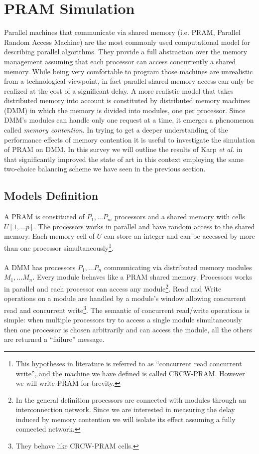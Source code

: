 \section{PRAM Simulation}

Parallel machines that communicate via shared memory
(i.e. PRAM, Parallel Random Access Machine) are the most
commonly used computational model for describing parallel algorithms.
They provide a full abstraction over the memory management assuming
that each processor can access concurrently a shared memory. While being
very comfortable to program those machines are unrealistic from a technological
viewpoint, in fact parallel shared memory access can only be realized at the
cost of a significant delay. A more realistic model that takes distributed
memory into account is constituted by distributed memory machines (DMM) in which
the memory is divided into modules, one per processor. Since DMM's modules can
handle only one request at a time, it emerges a phenomenon
called \textit{memory contention}.
In trying to get a deeper understanding of the performance
effects of memory contention it is useful to investigate the simulation of
 PRAM on DMM. In this survey we will outline the results of Karp {\em et al.} in
 \cite{Karp} that significantly improved the state of art in this context
 employing the same two-choice balancing scheme we have seen in the
 previous section.

\subsection{Models Definition}
  A PRAM is constituted of $P_1, \dots P_m$ processors
  and a shared memory with cells $U[1, \dots p]$. The processors
  works in parallel and have random access to the shared memory.
  Each memory cell of $U$ can store an integer and can be accessed
  by more than one processor simultaneously\footnote{This
    hypotheses in literature is referred
    to as ``concurrent read concurrent write'', and the machine we have defined
    is called CRCW-PRAM. However we will write PRAM for brevity.}. \\
 \\
  A DMM has processors $P_1, \dots P_n$ communicating via distributed
  memory modules $M_1, \dots M_n$. Every module behaves like a PRAM
  shared memory. Processors works in parallel and each
  processor can access any module\footnote{In the general definition processors
    are connected with modules through an interconnection network. Since we are
    interested in measuring the delay induced by memory contention we will
    isolate its effect assuming a fully connected network.}.
  Read and Write operations on a module are handled by a module's window
  allowing concurrent read and concurrent write\footnote{They
    behave like CRCW-PRAM cells.}. The semantic of concurrent read/write
  operations
  is simple:
  when multiple processors try to access a single module simultaneously then
  one processor is chosen
  arbitrarily and can access the module, all the others are returned a
  ``failure'' message. 

